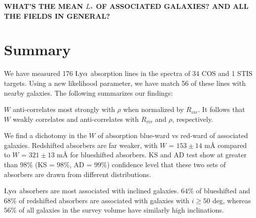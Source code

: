 \documentclass[iop]{emulateapj-rtx4}
\begin{document}
\textbf{WHAT'S THE MEAN $L_*$ OF ASSOCIATED GALAXIES? AND ALL THE FIELDS IN GENERAL?}

\section{Summary}

We have measured 176 $\rm Ly\alpha$ absorption lines in the spectra of 34 COS and 1 STIS targets. Using a new likelihood parameter, we have match 56 of these lines with nearby galaxies. The following summarizes our findings:

\indent \textbullet \indent $W$ anti-correlates most strongly with $\rho$ when normalized by $R_{vir}$. It follows that $W$ weakly correlates and anti-correlates with $R_{vir}$ and $\rho$, respectively.

\indent \textbullet \indent We find a dichotomy in the $W$ of absorption blue-ward vs red-ward of associated galaxies. Redshifted absorbers are far weaker, with $W$ = $153 \pm 14$ $\textrm{m\AA}$ compared to $W$ = $321 \pm 13$ $\textrm{m\AA}$ for blueshifted absorbers. KS and AD test show at greater than 98\% (KS = $98\%$, AD = $99\%$) confidence level that these two sets of absorbers are drawn from different distributions. 

\textbullet \indent $\rm Ly\alpha$ absorbers are most associated with inclined galaxies. $64\%$ of blueshifted and $68\%$ of redshifted absorbers are associated with galaxies with $i \geq 50$ deg, whereas $56\%$ of all galaxies in the survey volume have similarly high inclinations.

\nocite{*}


\end{document}
